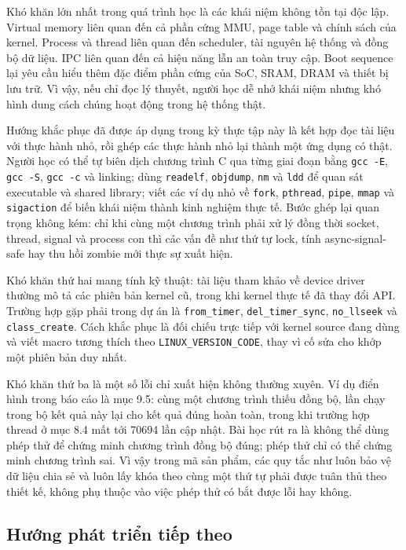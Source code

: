 \documentclass[11pt]{article}
\newcommand{\code}[1]{\texttt{#1}}
\begin{document}
Khó khăn lớn nhất trong quá trình học là các khái niệm không tồn tại độc lập. Virtual memory liên quan đến cả phần cứng MMU, page table và chính sách của kernel. Process và thread liên quan đến scheduler, tài nguyên hệ thống và đồng bộ dữ liệu. IPC liên quan đến cả hiệu năng lẫn an toàn truy cập. Boot sequence lại yêu cầu hiểu thêm đặc điểm phần cứng của SoC, SRAM, DRAM và thiết bị lưu trữ. Vì vậy, nếu chỉ đọc lý thuyết, người học dễ nhớ khái niệm nhưng khó hình dung cách chúng hoạt động trong hệ thống thật.

Hướng khắc phục đã được áp dụng trong kỳ thực tập này là kết hợp đọc tài liệu với thực hành nhỏ, rồi ghép các thực hành nhỏ lại thành một ứng dụng có thật. Người học có thể tự biên dịch chương trình C qua từng giai đoạn bằng \code{gcc -E}, \code{gcc -S}, \code{gcc -c} và linking; dùng \code{readelf}, \code{objdump}, \code{nm} và \code{ldd} để quan sát executable và shared library; viết các ví dụ nhỏ về \code{fork}, \code{pthread}, \code{pipe}, \code{mmap} và \code{sigaction} để biến khái niệm thành kinh nghiệm thực tế. Bước ghép lại quan trọng không kém: chỉ khi cùng một chương trình phải xử lý đồng thời socket, thread, signal và process con thì các vấn đề như thứ tự lock, tính async-signal-safe hay thu hồi zombie mới thực sự xuất hiện.

Khó khăn thứ hai mang tính kỹ thuật: tài liệu tham khảo về device driver thường mô tả các phiên bản kernel cũ, trong khi kernel thực tế đã thay đổi API. Trường hợp gặp phải trong dự án là \code{from\_timer}, \code{del\_timer\_sync}, \code{no\_llseek} và \code{class\_create}. Cách khắc phục là đối chiếu trực tiếp với kernel source đang dùng và viết macro tương thích theo \code{LINUX\_VERSION\_CODE}, thay vì cố sửa cho khớp một phiên bản duy nhất.

Khó khăn thứ ba là một số lỗi chỉ xuất hiện không thường xuyên. Ví dụ điển hình trong báo cáo là mục 9.5: cùng một chương trình thiếu đồng bộ, lần chạy trong bộ kết quả này lại cho kết quả đúng hoàn toàn, trong khi trường hợp thread ở mục 8.4 mất tới 70694 lần cập nhật. Bài học rút ra là không thể dùng phép thử để chứng minh chương trình đồng bộ đúng; phép thử chỉ có thể chứng minh chương trình sai. Vì vậy trong mã sản phẩm, các quy tắc như luôn bảo vệ dữ liệu chia sẻ và luôn lấy khóa theo cùng một thứ tự phải được tuân thủ theo thiết kế, không phụ thuộc vào việc phép thử có bắt được lỗi hay không.

\subsection{Hướng phát triển tiếp theo}
\end{document}
